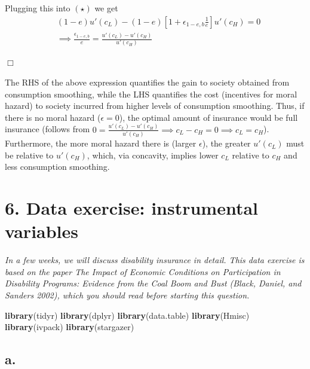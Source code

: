 \documentclass[
]{article}
\newenvironment{Shaded}{\begin{snugshade}}{\end{snugshade}}
\newcommand{\KeywordTok}[1]{\textcolor[rgb]{0.13,0.29,0.53}{\textbf{#1}}}
\newcommand{\NormalTok}[1]{#1}
\begin{document}
Plugging this into \((\star)\) we get \begin{align*}
&(1-e)u'(c_L) - (1-e)[1 + \epsilon_{1-e, b}\frac{1}{e}]u'(c_H) = 0 \\
&\implies \frac{\epsilon_{1-e,b}}{e} = \frac{u'(c_L) - u'(c_H)}{u'(c_H)}
\end{align*}

\hfill \(\Box\)

The RHS of the above expression quantifies the gain to society obtained
from consumption smoothing, while the LHS quantifies the cost
(incentives for moral hazard) to society incurred from higher levels of
consumption smoothing. Thus, if there is no moral hazard
(\(\epsilon = 0\)), the optimal amount of insurance would be full
insurance (follows from
\(0 = \frac{u'(c_L) - u'(c_H)}{u'(c_H)} \implies c_L - c_H = 0 \implies c_L = c_H\)).
Furthermore, the more moral hazard there is (larger \(\epsilon\)), the
greater \(u'(c_L)\) must be relative to \(u'(c_H)\), which, via
concavity, implies lower \(c_L\) relative to \(c_H\) and less
consumption smoothing.

\hypertarget{data-exercise-instrumental-variables}{%
\section{6. Data exercise: instrumental
variables}\label{data-exercise-instrumental-variables}}

\textit{In a few weeks, we will discuss disability insurance in detail. This data exercise is based on the paper The Impact of Economic Conditions on Participation in Disability Programs: Evidence from the Coal Boom and Bust (Black, Daniel, and Sanders 2002), which you should read before starting this question.}

\begin{Shaded}
\begin{Highlighting}[]
\KeywordTok{library}\NormalTok{(tidyr)}
\KeywordTok{library}\NormalTok{(dplyr)}
\KeywordTok{library}\NormalTok{(data.table)}
\KeywordTok{library}\NormalTok{(Hmisc)}
\KeywordTok{library}\NormalTok{(ivpack)}
\KeywordTok{library}\NormalTok{(stargazer)}
\end{Highlighting}
\end{Shaded}

\hypertarget{a.-4}{%
\subsection{a.}\label{a.-4}}
\end{document}
